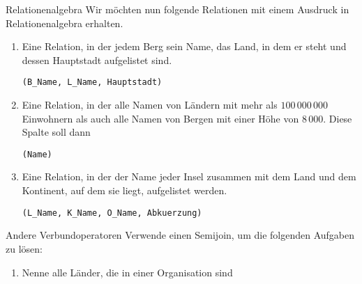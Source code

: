 \documentclass[12pt,a4paper,notitlepage,leqno]{article}
\begin{document}
\begin{paufgabe}{Relationenalgebra}
    Wir möchten nun folgende Relationen mit einem Ausdruck in Relationenalgebra erhalten.

    \begin{enumerate}
        \item Eine Relation, in der jedem Berg sein Name, das Land, in dem er steht und dessen Hauptstadt aufgelistet sind.
        \begin{center}
            {\tt (B\_Name, L\_Name, Hauptstadt)}
        \end{center}

        \item Eine Relation, in der alle Namen von Ländern mit mehr als $100\,000\,000$ Einwohnern als auch alle Namen von Bergen mit einer Höhe von $8\,000$. Diese Spalte soll dann 
        \begin{center}
            {\tt (Name)}
        \end{center}

        \item Eine Relation, in der der Name jeder Insel zusammen mit dem Land und dem Kontinent, auf dem sie liegt, aufgelistet werden.
        \begin{center}
            {\tt (L\_Name, K\_Name, O\_Name, Abkuerzung)}
        \end{center}
    \end{enumerate}
\end{paufgabe}

\begin{paufgabe}{Andere Verbundoperatoren}
    Verwende einen Semijoin, um die folgenden Aufgaben zu lösen:
        \begin{enumerate}
            \item Nenne alle Länder, die in einer Organisation sind
        \end{enumerate}
\end{paufgabe}
\end{document}
